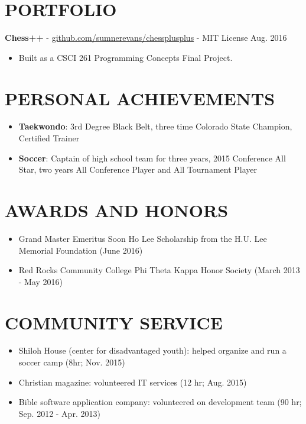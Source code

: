 \documentclass[10.5pt,letterpaper]{article}
\begin{document}
\section*{PORTFOLIO}
\textbf{Chess++} -
\href{https://github.com/sumnerevans/chessplusplus}{github.com/sumnerevans/chessplusplus}
- MIT License \hfill Aug. 2016
\begin{itemize}
    \item Built as a CSCI 261 Programming Concepts Final Project.
\end{itemize}

\section*{PERSONAL ACHIEVEMENTS}
\begin{itemize}
    \item \textbf{Taekwondo}: 3rd Degree Black Belt, three time Colorado State
        Champion, Certified Trainer
    \item \textbf{Soccer}: Captain of high school team for three years, 2015
        Conference All Star, two years All Conference Player and All Tournament
        Player
\end{itemize}

\section*{AWARDS AND HONORS}
\begin{itemize}
    \item Grand Master Emeritus Soon Ho Lee Scholarship from the H.U. Lee
        Memorial Foundation (June 2016)
    \item Red Rocks Community College Phi Theta Kappa Honor Society (March 2013
        - May 2016)
\end{itemize}

\section*{COMMUNITY SERVICE}
\begin{itemize}
    \item Shiloh House (center for disadvantaged youth): helped organize and run
        a soccer camp (8hr; Nov. 2015)
    \item Christian magazine: volunteered IT services (12 hr; Aug. 2015)
    \item Bible software application company: volunteered on development team
        (90 hr; Sep.  2012 - Apr. 2013)
\end{itemize}
\end{document}
